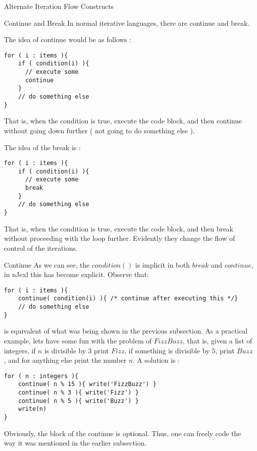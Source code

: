 \begin{section}{Alternate Iteration Flow Constructs}

\begin{subsection}{Continue and Break}
In normal iterative languages, there are continue and break.

The idea of continue would be as follows :
\begin{lstlisting}[style=JexlStyle]
for ( i : items ){
    if ( condition(i) ){
      // execute some 
      continue 
    }
    // do something else 
}
\end{lstlisting}
That is, when the condition is true, execute the code block, 
and then continue without going down further ( not going to do something else ). 

The idea of the break is :
\begin{lstlisting}[style=JexlStyle]
for ( i : items ){
    if ( condition(i) ){
      // execute some 
      break 
    }
    // do something else 
}
\end{lstlisting}
That is, when the condition is true, execute the code block, 
and then break without proceeding with the loop further. 
Evidently they change the flow of control of the iterations.
\end{subsection}

\begin{subsection}{Continue}
As we can see, the $condition()$ is implicit in both $break$ and $continue$,
in nJexl this has become explicit. Observe that:  

\begin{lstlisting}[style=JexlStyle]
for ( i : items ){
    continue( condition(i) ){ /* continue after executing this */} 
    // do something else 
}
\end{lstlisting}
is equivalent of what was being shown in the previous subsection.
As a practical example, lets have some fun with the problem of $FizzBuzz$,
that is, given a list of integers, if $n$ is divisible by $3$ print $Fizz$,
if something is divisible by $5$, print $Buzz$, and for anything else print the number $n$. 
A solution is :

\begin{lstlisting}[style=JexlStyle]
for ( n : integers ){
    continue( n % 15 ){ write('FizzBuzz') }
    continue( n % 3 ){ write('Fizz') }
    continue( n % 5 ){ write('Buzz') }
    write(n) 
}
\end{lstlisting}
Obviously, the block of the continue is optional.
Thus, one can freely code the way it was mentioned in the 
earlier subsection.
\end{subsection}



\end{section}

